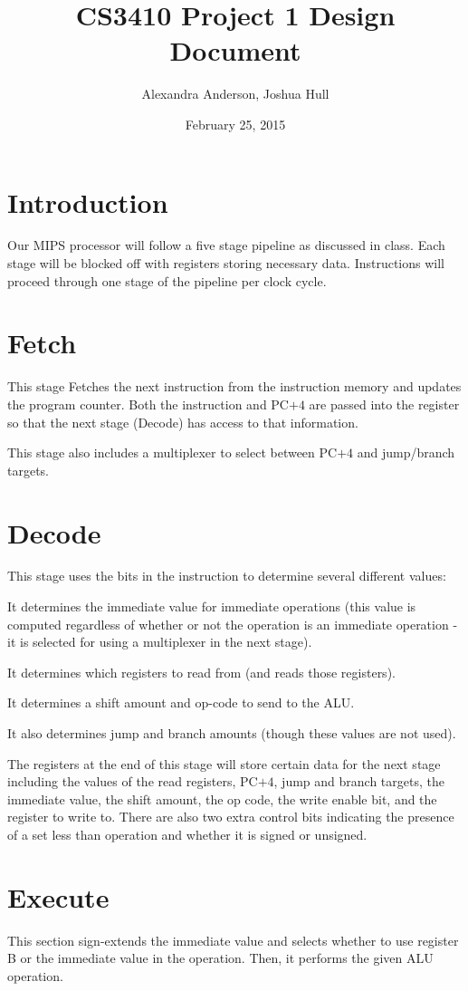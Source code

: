 \documentclass{article}
\title{CS3410 Project 1 Design Document}
\date{February 25, 2015}
\author{Alexandra Anderson, Joshua Hull}
\begin{document}
\maketitle

\section*{Introduction}
Our MIPS processor will follow a five stage pipeline as discussed in class.  Each stage will be blocked off with registers storing necessary data.  Instructions will proceed through one stage of the pipeline per clock cycle.

\section*{Fetch}
This stage Fetches the next instruction from the instruction memory and updates the program counter.  Both the instruction and PC$+4$ are passed into the register so that the next stage (Decode) has access to that information.  

This stage also includes a multiplexer to select between PC$+4$ and jump/branch targets.

\section*{Decode}
This stage uses the bits in the instruction to determine several different values:

It determines the immediate value for immediate operations (this value is computed regardless of whether or not the operation is an immediate operation - it is selected for using a multiplexer in the next stage).

It determines which registers to read from (and reads those registers).

It determines a shift amount and op-code to send to the ALU.

It also determines jump and branch amounts (though these values are not used).

The registers at the end of this stage will store certain data for the next stage including the values of the read registers, PC$+4$, jump and branch targets, the immediate value, the shift amount, the op code, the write enable bit, and the register to write to. There are also two extra control bits indicating the presence of a set less than operation and whether it is signed or unsigned. 

\section*{Execute}
This section sign-extends the immediate value and selects whether to use register B or the immediate value in the operation.  Then, it performs the given ALU operation.
\end{document}
